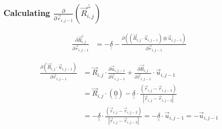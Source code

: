 \documentclass{article}
\renewcommand{\ij}{_{i,j}}
\newcommand{\ijj}{_{i,j-1}}
\newcommand{\ijjj}{_{i,j-2}}
\newcommand{\magn}[1]{\left\vert #1 \right\vert }
\renewcommand{\part}[2]{\frac{\partial #1 }{\partial #2}}
\newcommand{\partbig}[2]{\frac{\partial }{\partial #2}\left( #1 \right)}
\newcommand{\ten}[1]{\underline{\underline{#1}}}
\newcommand{\rij}{\vec{r} \ij}
\newcommand{\Rij}{\vec{R} \ij}
\newcommand{\rijj}{\vec{r} \ijj}
\newcommand{\rijjj}{\vec{r} \ijjj}
\newcommand{\uijj}{\vec{u} \ijj}
\begin{document}


\subsubsection{Calculating $\displaystyle\partbig{\Rij^\perp}{\rijj}$}
\begin{align*}
  \part{\vec{R}\ij ^ \bot}{\vec{r}\ijj}  &= - \ten{\delta} 
  - \part{\left(\left(\vec{R}\ij \cdot \vec{u} \ijj \right) \otimes 
  \vec{u} \ijj \right)
  }{\vec{r}\ijj}
\end{align*}


\begin{align*}
  \part{\left(\vec{R}\ij \cdot \vec{u} \ijj \right)}{\vec{r}\ijj}   
  &= 
  \vec{R}\ij \cdot \part{\vec{u} \ijj}{\vec{r} \ijj} + \part{\vec{R} \ij}{\vec{r} \ijj} \cdot \vec{u}\ijj
  \\
  &= 
  \Rij \cdot \left( \ten{0}
  \right) 
  - \ten{\delta} \cdot \frac{\left( \rij - \rijjj \right)}{\magn{\rij - \rijjj}} 
  \\ 
  &= 
  - \ten{\delta} \cdot \frac{\left( \rij - \rijjj \right)}{\magn{\rij - \rijjj}} 
  =
  - \ten{\delta} \cdot \uijj
  =
  - \uijj
\end{align*}
\end{document}
